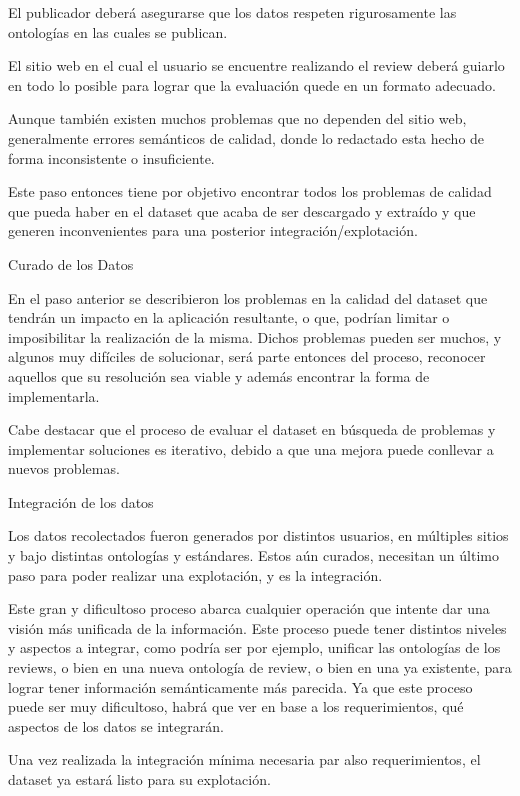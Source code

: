 El publicador deberá asegurarse que los datos respeten rigurosamente las ontologías en las cuales se publican.

El sitio web en el cual el usuario se encuentre realizando el review deberá guiarlo en todo lo posible para lograr que la evaluación
quede en un formato adecuado.


Aunque también existen muchos problemas que no dependen del sitio web, generalmente errores semánticos de calidad, donde lo 
redactado esta hecho de forma inconsistente o insuficiente.


Este paso entonces tiene por objetivo encontrar todos los problemas de calidad que pueda haber en el dataset que acaba de 
ser descargado y extraído y que generen inconvenientes para una posterior integración/explotación.

%
Curado de los Datos

En el paso anterior se describieron los problemas en la calidad del dataset que tendrán un impacto en la aplicación resultante, 
o que, podrían limitar o imposibilitar la realización de la misma. Dichos problemas pueden ser muchos, y algunos muy difíciles
de solucionar, será parte entonces del proceso, reconocer aquellos que su resolución sea viable y además encontrar la forma de 
implementarla.

Cabe destacar que el proceso de evaluar el dataset en búsqueda de problemas y implementar soluciones es iterativo, debido a que 
una mejora puede conllevar a nuevos problemas.

%

Integración de los datos

Los datos recolectados fueron generados por distintos usuarios, en múltiples sitios y bajo distintas ontologías y estándares.
Estos aún curados, necesitan un último paso para poder realizar una explotación, y es la integración.

Este gran y dificultoso proceso abarca cualquier operación que intente dar una visión más unificada de la información. Este
proceso puede tener distintos niveles y aspectos a integrar, como podría ser por ejemplo, unificar las ontologías de los reviews, o bien
en una nueva ontología de review, o bien en una ya existente, para lograr tener información semánticamente más parecida. Ya 
que este proceso puede ser muy dificultoso, habrá que ver en base a los requerimientos, qué aspectos de los datos se integrarán.

Una vez realizada la integración mínima necesaria par also requerimientos, el dataset ya estará listo para su explotación.